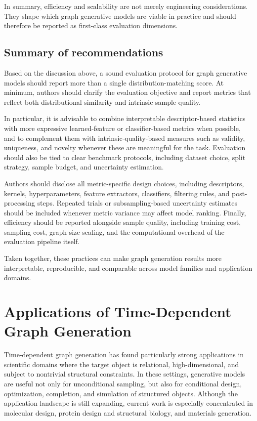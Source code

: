\documentclass{article}
\begin{document}
In summary, efficiency and scalability are not merely engineering considerations. They shape which graph generative models are viable in practice and should therefore be reported as first-class evaluation dimensions.

\subsection{Summary of recommendations}
\label{subsec:evaluation_recommendations}

Based on the discussion above, a sound evaluation protocol for graph generative models should report more than a single distribution-matching score. At minimum, authors should clarify the evaluation objective and report metrics that reflect both distributional similarity and intrinsic sample quality.

In particular, it is advisable to combine interpretable descriptor-based statistics with more expressive learned-feature or classifier-based metrics when possible, and to complement them with intrinsic-quality-based measures such as validity, uniqueness, and novelty whenever these are meaningful for the task. Evaluation should also be tied to clear benchmark protocols, including dataset choice, split strategy, sample budget, and uncertainty estimation.

Authors should disclose all metric-specific design choices, including descriptors, kernels, hyperparameters, feature extractors, classifiers, filtering rules, and post-processing steps. Repeated trials or subsampling-based uncertainty estimates should be included whenever metric variance may affect model ranking. Finally, efficiency should be reported alongside sample quality, including training cost, sampling cost, graph-size scaling, and the computational overhead of the evaluation pipeline itself.

Taken together, these practices can make graph generation results more interpretable, reproducible, and comparable across model families and application domains.


\section{Applications of Time-Dependent Graph Generation}
\label{sec:applications}

Time-dependent graph generation has found particularly strong applications in scientific domains where the target object is relational, high-dimensional, and subject to nontrivial structural constraints. In these settings, generative models are useful not only for unconditional sampling, but also for conditional design, optimization, completion, and simulation of structured objects. Although the application landscape is still expanding, current work is especially concentrated in molecular design, protein design and structural biology, and materials generation.
\end{document}
